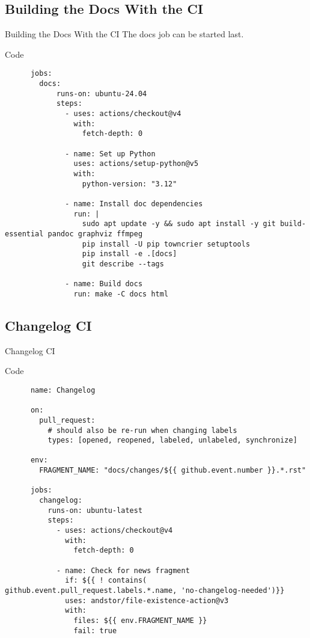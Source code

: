 \subsection{Building the Docs With the CI}
\begin{frame}[fragile]{Building the Docs With the CI}
  The docs job can be started last.
  \begin{block}{Code}
  \footnotesize
    \begin{verbatim}
      jobs:
        docs:
            runs-on: ubuntu-24.04
            steps:
              - uses: actions/checkout@v4
                with:
                  fetch-depth: 0

              - name: Set up Python
                uses: actions/setup-python@v5
                with:
                  python-version: "3.12"

              - name: Install doc dependencies
                run: |
                  sudo apt update -y && sudo apt install -y git build-essential pandoc graphviz ffmpeg
                  pip install -U pip towncrier setuptools
                  pip install -e .[docs]
                  git describe --tags

              - name: Build docs
                run: make -C docs html
    \end{verbatim}
  \end{block}
\end{frame}


\subsection{Changelog CI}
\begin{frame}[fragile]{Changelog CI}
  \begin{block}{Code}
    \footnotesize
    \begin{verbatim}
      name: Changelog

      on:
        pull_request:
          # should also be re-run when changing labels
          types: [opened, reopened, labeled, unlabeled, synchronize]

      env:
        FRAGMENT_NAME: "docs/changes/${{ github.event.number }}.*.rst"

      jobs:
        changelog:
          runs-on: ubuntu-latest
          steps:
            - uses: actions/checkout@v4
              with:
                fetch-depth: 0

            - name: Check for news fragment
              if: ${{ ! contains( github.event.pull_request.labels.*.name, 'no-changelog-needed')}}
              uses: andstor/file-existence-action@v3
              with:
                files: ${{ env.FRAGMENT_NAME }}
                fail: true
    \end{verbatim}
  \end{block}
\end{frame}


